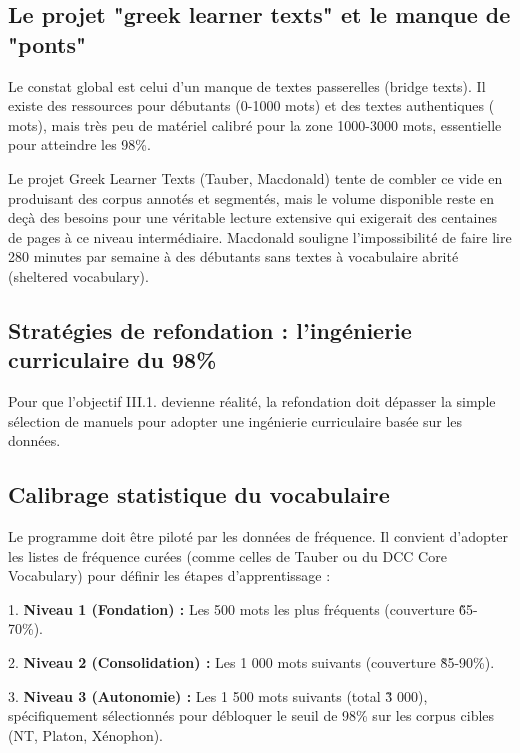 {{\subsection{Le projet "greek learner texts" et le manque de "ponts"}

Le constat global est celui d'un manque de textes \og passerelles\fg{} (bridge texts). Il existe des
ressources pour débutants (0-1000 mots) et des textes authentiques ( mots), mais très peu de
matériel calibré pour la zone 1000-3000 mots, essentielle pour atteindre les 98\%.

Le projet Greek Learner Texts (Tauber, Macdonald) tente de combler ce vide en produisant des corpus
annotés et segmentés, mais le volume disponible reste en deçà des besoins pour une véritable \og
lecture extensive\fg{} qui exigerait des centaines de pages à ce niveau
intermédiaire.\cite{III-1-2-ref48} Macdonald souligne l'impossibilité de faire lire 280 minutes par
semaine à des débutants sans textes à \og vocabulaire abrité\fg{} (sheltered
vocabulary).\cite{III-1-2-ref50}



\subsection{Stratégies de refondation : l'ingénierie curriculaire du 98\%}

Pour que l'objectif III.1.\cite{III-1-2-ref2} devienne réalité, la refondation doit dépasser la
simple sélection de manuels pour adopter une ingénierie curriculaire basée sur les données.



\subsection{Calibrage statistique du vocabulaire}

Le programme doit être piloté par les données de fréquence. Il convient d'adopter les listes de
fréquence curées (comme celles de Tauber ou du DCC Core Vocabulary) pour définir les étapes
d'apprentissage :

1. \textbf{Niveau 1 (Fondation) :} Les 500 mots les plus fréquents (couverture
\~65-70\%).\cite{III-1-2-ref27}

2. \textbf{Niveau 2 (Consolidation) :} Les 1 000 mots suivants (couverture \~85-90\%).

3. \textbf{Niveau 3 (Autonomie) :} Les 1 500 mots suivants (total \~3 000), spécifiquement
sélectionnés pour débloquer le seuil de 98\% sur les corpus cibles (NT, Platon,
Xénophon).\cite{III-1-2-ref4}



}}
